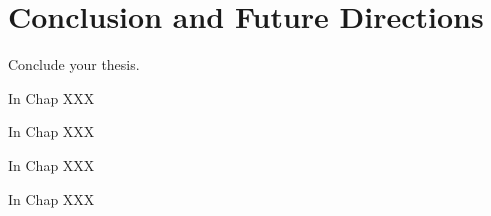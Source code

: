 \chapter{Conclusion and Future Directions}
\label{chap:conclude}

Conclude your thesis.

In Chap XXX


In Chap XXX

In Chap XXX


In Chap XXX